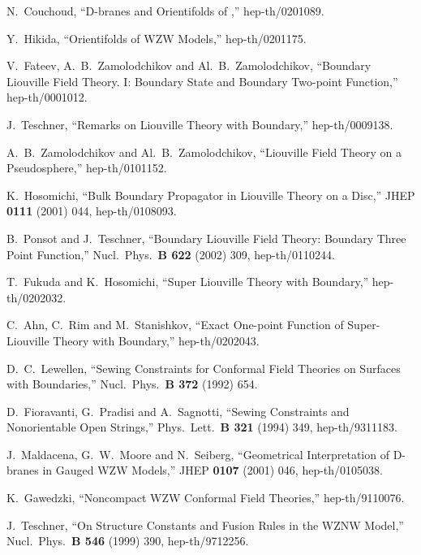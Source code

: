 \documentclass[a4paper,12pt]{article}
\providecommand{\bc}{\mathbb C}
\begin{document}
\begin{thebibliography}{99}
N.~Couchoud,
``D-branes and Orientifolds of \coordHE{},''
        hep-th/0201089.

Y.~Hikida,
``Orientifolds of \coordHE{} WZW Models,'' hep-th/0201175.

V.~Fateev, A.~B.~Zamolodchikov and Al.~B.~Zamolodchikov,
``Boundary Liouville Field Theory. I: Boundary State and Boundary
	Two-point Function,'' hep-th/0001012.


J.~Teschner,
``Remarks on Liouville Theory with Boundary,'' hep-th/0009138.

A.~B.~Zamolodchikov and Al.~B.~Zamolodchikov, 
``Liouville Field Theory on a Pseudosphere,'' hep-th/0101152.


K.~Hosomichi,
``Bulk Boundary Propagator in Liouville Theory on a Disc,''
JHEP {\bf 0111} (2001) 044, hep-th/0108093.

B.~Ponsot and J.~Teschner,
``Boundary Liouville Field Theory: Boundary Three Point Function,''
Nucl.\ Phys.\ {\bf B 622} (2002) 309, hep-th/0110244.


T.~Fukuda and K.~Hosomichi,
``Super Liouville Theory with Boundary,'' hep-th/0202032.


C.~Ahn, C.~Rim and M.~Stanishkov,
``Exact One-point Function of \coordHE{} Super-Liouville Theory with Boundary,''
hep-th/0202043.

D.~C.~Lewellen,
``Sewing Constraints for Conformal Field Theories on Surfaces with
	Boundaries,'' 
Nucl.\ Phys.\ {\bf B 372} (1992) 654.

D.~Fioravanti, G.~Pradisi and A.~Sagnotti,
``Sewing Constraints and Nonorientable Open Strings,''
Phys.\ Lett.\ {\bf B 321} (1994) 349, hep-th/9311183.

J.~Maldacena, G.~W.~Moore and N.~Seiberg,
``Geometrical Interpretation of D-branes in Gauged WZW Models,''
JHEP {\bf 0107} (2001) 046,
hep-th/0105038.

K.~Gawedzki,
``Noncompact WZW Conformal Field Theories,'' hep-th/9110076.

J.~Teschner,
``On Structure Constants and Fusion Rules in the \myHighlight{$SL(2,\bc)/SU(2)$}\coordHE{} WZNW
	Model,'' 
Nucl.\ Phys.\ {\bf B 546} (1999) 390, hep-th/9712256.

\end{thebibliography}
\end{document}
